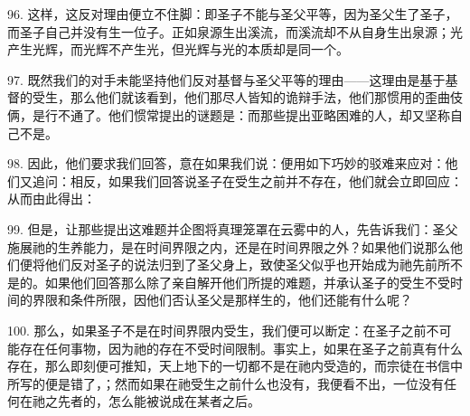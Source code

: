 96. 这样，这反对理由便立不住脚：即圣子不能与圣父平等，因为圣父生了圣子，而圣子自己并没有生一位子。正如泉源生出溪流，而溪流却不从自身生出泉源；光产生光辉，而光辉不产生光，但光辉与光的本质却是同一个。\par

\par

97. 既然我们的对手未能坚持他们反对基督与圣父平等的理由——这理由是基于基督的受生，那么他们就该看到，他们那尽人皆知的诡辩手法，他们那惯用的歪曲伎俩，是行不通了。他们惯常提出的谜题是：而那些提出亚略困难的人，却又坚称自己不是。\par

98. 因此，他们要求我们回答，意在如果我们说：便用如下巧妙的驳难来应对：他们又追问：相反，如果我们回答说圣子在受生之前并不存在，他们就会立即回应：从而由此得出：\par

99. 但是，让那些提出这难题并企图将真理笼罩在云雾中的人，先告诉我们：圣父施展祂的生养能力，是在时间界限之内，还是在时间界限之外？如果他们说那么他们便将他们反对圣子的说法归到了圣父身上，致使圣父似乎也开始成为祂先前所不是的。如果他们回答那么除了亲自解开他们所提的难题，并承认圣子的受生不受时间的界限和条件所限，因他们否认圣父是那样生的，他们还能有什么呢？\par

100. 那么，如果圣子不是在时间界限内受生，我们便可以断定：在圣子之前不可能存在任何事物，因为祂的存在不受时间限制。事实上，如果在圣子之前真有什么存在，那么即刻便可推知，天上地下的一切都不是在祂内受造的，而宗徒在书信中所写的便是错了，；然而如果在祂受生之前什么也没有，我便看不出，一位没有任何在祂之先者的，怎么能被说成在某者之后。\par

